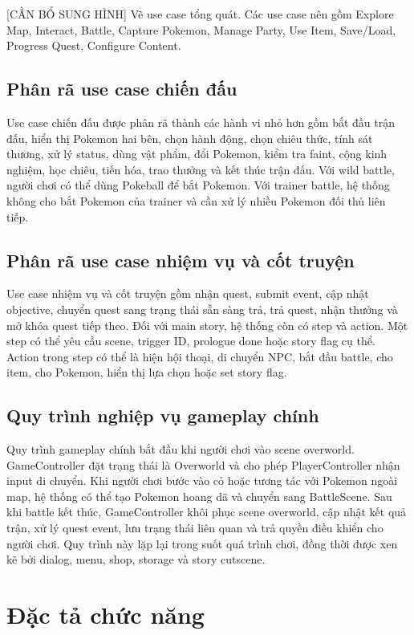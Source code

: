 [CẦN BỔ SUNG HÌNH] Vẽ use case tổng quát. Các use case nên gồm Explore Map, Interact, Battle, Capture Pokemon, Manage Party, Use Item, Save/Load, Progress Quest, Configure Content.

\subsection{Phân rã use case chiến đấu}

Use case chiến đấu được phân rã thành các hành vi nhỏ hơn gồm bắt đầu trận đấu, hiển thị Pokemon hai bên, chọn hành động, chọn chiêu thức, tính sát thương, xử lý status, dùng vật phẩm, đổi Pokemon, kiểm tra faint, cộng kinh nghiệm, học chiêu, tiến hóa, trao thưởng và kết thúc trận đấu. Với wild battle, người chơi có thể dùng Pokeball để bắt Pokemon. Với trainer battle, hệ thống không cho bắt Pokemon của trainer và cần xử lý nhiều Pokemon đối thủ liên tiếp.

\subsection{Phân rã use case nhiệm vụ và cốt truyện}

Use case nhiệm vụ và cốt truyện gồm nhận quest, submit event, cập nhật objective, chuyển quest sang trạng thái sẵn sàng trả, trả quest, nhận thưởng và mở khóa quest tiếp theo. Đối với main story, hệ thống còn có step và action. Một step có thể yêu cầu scene, trigger ID, prologue done hoặc story flag cụ thể. Action trong step có thể là hiện hội thoại, di chuyển NPC, bắt đầu battle, cho item, cho Pokemon, hiển thị lựa chọn hoặc set story flag.

\subsection{Quy trình nghiệp vụ gameplay chính}

Quy trình gameplay chính bắt đầu khi người chơi vào scene overworld. GameController đặt trạng thái là Overworld và cho phép PlayerController nhận input di chuyển. Khi người chơi bước vào cỏ hoặc tương tác với Pokemon ngoài map, hệ thống có thể tạo Pokemon hoang dã và chuyển sang BattleScene. Sau khi battle kết thúc, GameController khôi phục scene overworld, cập nhật kết quả trận, xử lý quest event, lưu trạng thái liên quan và trả quyền điều khiển cho người chơi. Quy trình này lặp lại trong suốt quá trình chơi, đồng thời được xen kẽ bởi dialog, menu, shop, storage và story cutscene.

\section{Đặc tả chức năng}

